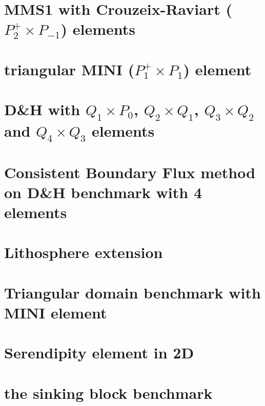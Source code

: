 \documentclass[a4paper,11pt]{report}
\begin{document}
\chapter{MMS1 with Crouzeix-Raviart ($P_2^+\times P_{-1}$) elements  \label{f46}} 

\chapter{triangular MINI ($P_1^+\times P_1$) element \label{f47}} 

\chapter{D\&H with $Q_1\times P_0$, $Q_2\times Q_1$, $Q_3\times Q_2$ and $Q_4\times Q_3$ elements
\label{f48}} 

\chapter{Consistent Boundary Flux method on D\&H benchmark with 4 elements \label{f49}} 

\chapter{Lithosphere extension \label{f50}} 

\chapter{Triangular domain benchmark with MINI element\label{f51}} 

\chapter{Serendipity element in 2D \label{f52}} 

\chapter{the sinking block benchmark \label{f53}} 
\end{document}
